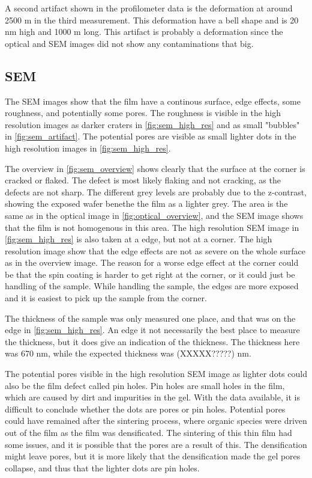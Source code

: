 A second artifact shown in the profilometer data is the deformation at around 2500 \textmu m in the third measurement.
This deformation have a bell shape and is 20 nm high and 1000 \textmu m long.
This artifact is probably a deformation since the optical and SEM images did not show any contaminations that big.


\subsection{SEM}

\noindent The SEM images show that the film have a continous surface, edge effects, some roughness, and potentially some pores.
The roughness is visible in the high resolution images as darker craters in \autoref{fig:sem_high_res} and as small "bubbles" in \autoref{fig:sem_artifact}.
The potential pores are visible as small lighter dots in the high resolution images in \autoref{fig:sem_high_res}.

The overview in \autoref{fig:sem_overview} shows clearly that the surface at the corner is cracked or flaked.
The defect is most likely flaking and not cracking, as the defects are not sharp.
The different grey levels are probably due to the z-contrast, showing the exposed wafer benethe the film as a lighter grey.
The area is the same as in the optical image in \autoref{fig:optical_overview}, and the SEM image shows that the film is not homogenous in this area.
The high resolution SEM image in \autoref{fig:sem_high_res} is also taken at a edge, but not at a corner.
The high resolution image show that the edge effects are not as severe on the whole surface as in the overview image.
The reason for a worse edge effect at the corner could be that the spin coating is harder to get right at the corner, or it could just be handling of the sample.
While handling the sample, the edges are more exposed and it is easiest to pick up the sample from the corner.

The thickness of the sample was only measured one place, and that was on the edge in \autoref{fig:sem_high_res}.
An edge it not necessarily the best place to measure the thickness, but it does give an indication of the thickness.
The thickness here was 670 nm, while the expected thickness was (XXXXX?????) nm.


The potential pores visible in the high resolution SEM image as lighter dots could also be the film defect called pin holes.
Pin holes are small holes in the film, which are caused by dirt and impurities in the gel.
With the data available, it is difficult to conclude whether the dots are pores or pin holes.
Potential pores could have remained after the sintering process, where organic species were driven out of the film as the film was densificated.
The sintering of this thin film had some issues, and it is possible that the pores are a result of this.
The densification might leave pores, but it is more likely that the densification made the gel pores collapse, and thus that the lighter dots are pin holes.

